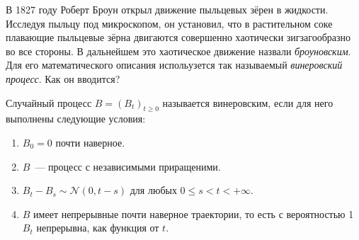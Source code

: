 В 1827 году Роберт Броун открыл движение пыльцевых зёрен в жидкости. Исследуя 
пыльцу под микроскопом, он установил, что в растительном соке плавающие 
пыльцевые зёрна двигаются совершенно хаотически зигзагообразно во все стороны. 
В дальнейшем это хаотическое движение назвали \emph{броуновским}. Для его 
математического описания испольузется так называемый \emph{винеровский 
процесс}. Как он вводится?
\begin{definition}
	Случайный процесс \(B = (B_{t})_{t \geq 0}\) называется винеровским, если 
	для него выполнены следующие условия:
	\begin{enumerate}
		\item \(B_{0} = 0\) почти наверное.
		\item \(B\)~--- процесс с независимыми приращеними.
		\item \(B_{t} - B_{s} \sim \mathcal{N}(0, t - s)\) для любых 
		\(0 \leq s < t < +\infty\).
		\item \(B\) имеет непрерывные почти наверное траектории, то есть с 
		вероятностью 1 \(B_{t}\) непрерывна, как функция от \(t\).
	\end{enumerate}
\end{definition}

